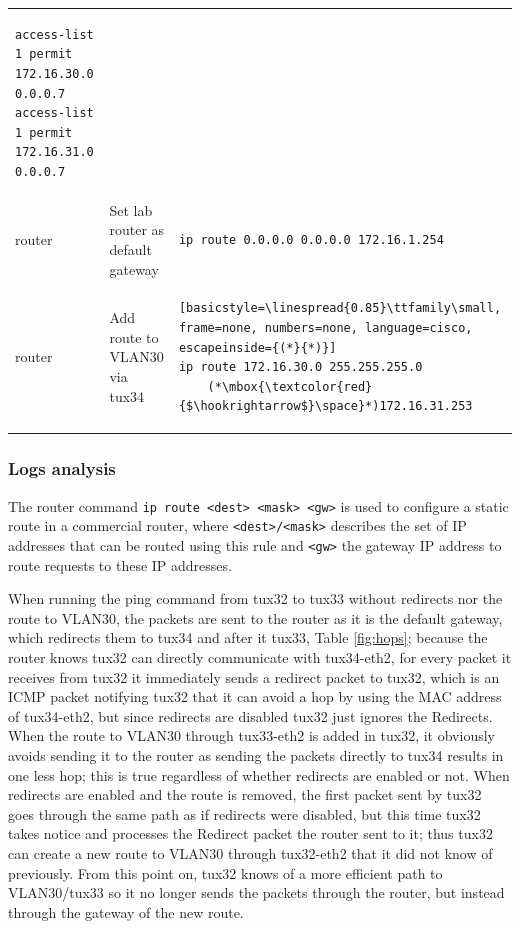 \documentclass[a4paper, 11pt]{report}
\begin{document}
\begin{center}
\begin{longtable}{@{}l | m{77mm} | l@{}}
\begin{lstlisting}[basicstyle=\linespread{0.85}\ttfamily\small, frame=none, numbers=none, language=cisco]
access-list 1 permit 172.16.30.0 0.0.0.7
access-list 1 permit 172.16.31.0 0.0.0.7
        \end{lstlisting}\\
        router & Set lab router as default gateway & \begin{lstlisting}[basicstyle=\linespread{0.85}\ttfamily\small, frame=none, numbers=none, language=cisco]
ip route 0.0.0.0 0.0.0.0 172.16.1.254
        \end{lstlisting}\\
        router & Add route to VLAN30 via tux34 & \begin{lstlisting}[basicstyle=\linespread{0.85}\ttfamily\small, frame=none, numbers=none, language=cisco, escapeinside={(*}{*)}]
ip route 172.16.30.0 255.255.255.0
    (*\mbox{\textcolor{red}{$\hookrightarrow$}\space}*)172.16.31.253
        \end{lstlisting}
    \end{longtable}
\end{center}

\subsubsection{Logs analysis} \label{sec:Log4}

The router command \texttt{ip route <dest> <mask> <gw>} is used to configure a static route in a commercial router, where \texttt{<dest>/<mask>} describes the set of IP addresses that can be routed using this rule and \texttt{<gw>} the gateway IP address to route requests to these IP addresses.

When running the ping command from tux32 to tux33 without redirects nor the route to VLAN30, the packets are sent to the router as it is the default gateway, which redirects them to tux34 and after it tux33, Table \ref{fig:hops}; because the router knows tux32 can directly communicate with tux34-eth2, for every packet it receives from tux32 it immediately sends a redirect packet to tux32, which is an ICMP packet notifying tux32 that it can avoid a hop by using the MAC address of tux34-eth2, but since redirects are disabled tux32 just ignores the Redirects.
When the route to VLAN30 through tux33-eth2 is added in tux32, it obviously avoids sending it to the router as sending the packets directly to tux34 results in one less hop; this is true regardless of whether redirects are enabled or not.
When redirects are enabled and the route is removed, the first packet sent by tux32 goes through the same path as if redirects were disabled, but this time tux32 takes notice and processes the Redirect packet the router sent to it; thus tux32 can create a new route to VLAN30 through tux32-eth2 that it did not know of previously. From this point on, tux32 knows of a more efficient path to VLAN30/tux33 so it no longer sends the packets through the router, but instead through the gateway of the new route.
\end{document}
